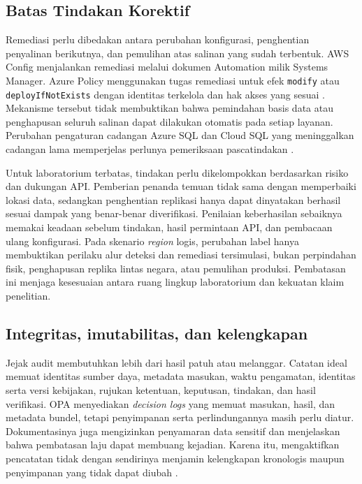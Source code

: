 \subsection{Batas Tindakan Korektif}

Remediasi perlu dibedakan antara perubahan konfigurasi, penghentian penyalinan berikutnya, dan pemulihan atas salinan yang sudah terbentuk. AWS Config menjalankan remediasi melalui dokumen Automation milik Systems Manager. Azure Policy menggunakan tugas remediasi untuk efek \texttt{modify} atau \texttt{deployIfNotExists} dengan identitas terkelola dan hak akses yang sesuai \autocite{b2c_awsConfigRemediation,b2c_azurePolicyRemediation}. Mekanisme tersebut tidak membuktikan bahwa pemindahan basis data atau penghapusan seluruh salinan dapat dilakukan otomatis pada setiap layanan. Perubahan pengaturan cadangan Azure SQL dan Cloud SQL yang meninggalkan cadangan lama memperjelas perlunya pemeriksaan pascatindakan \autocite{b2c_azureSqlBackup,b2c_gcpSqlBackups}.

Untuk laboratorium terbatas, tindakan perlu dikelompokkan berdasarkan risiko dan dukungan API. Pemberian penanda temuan tidak sama dengan memperbaiki lokasi data, sedangkan penghentian replikasi hanya dapat dinyatakan berhasil sesuai dampak yang benar-benar diverifikasi. Penilaian keberhasilan sebaiknya memakai keadaan sebelum tindakan, hasil permintaan API, dan pembacaan ulang konfigurasi. Pada skenario \textit{region} logis, perubahan label hanya membuktikan perilaku alur deteksi dan remediasi tersimulasi, bukan perpindahan fisik, penghapusan replika lintas negara, atau pemulihan produksi. Pembatasan ini menjaga kesesuaian antara ruang lingkup laboratorium dan kekuatan klaim penelitian.

\subsection{Integritas, imutabilitas, dan kelengkapan}

Jejak audit membutuhkan lebih dari hasil patuh atau melanggar. Catatan ideal memuat identitas sumber daya, metadata masukan, waktu pengamatan, identitas serta versi kebijakan, rujukan ketentuan, keputusan, tindakan, dan hasil verifikasi. OPA menyediakan \textit{decision logs} yang memuat masukan, hasil, dan metadata bundel, tetapi penyimpanan serta perlindungannya masih perlu diatur. Dokumentasinya juga mengizinkan penyamaran data sensitif dan menjelaskan bahwa pembatasan laju dapat membuang kejadian. Karena itu, mengaktifkan pencatatan tidak dengan sendirinya menjamin kelengkapan kronologis maupun penyimpanan yang tidak dapat diubah \autocite{b2c_opaDecisionLogs}.

